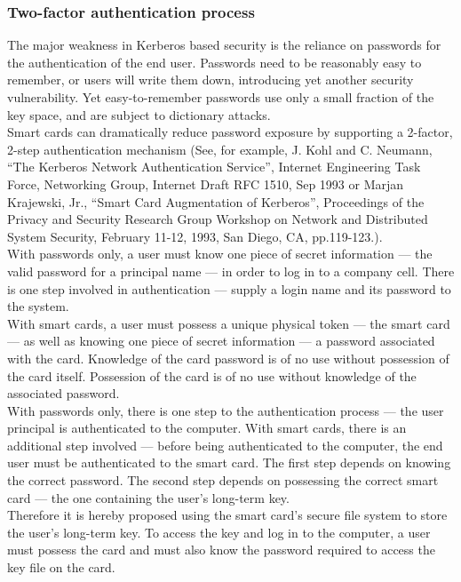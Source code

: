 \subsubsection{Two-factor authentication process}
The major weakness in Kerberos based security is the reliance on
passwords for the authentication of the end user. Passwords need to be
reasonably easy to remember, or users will write them down, introducing
yet another security vulnerability. Yet easy-to-remember passwords use
only a small fraction of the key space, and are subject to dictionary
attacks.\\

Smart cards can dramatically reduce password exposure by supporting a
2-factor, 2-step authentication mechanism (See, for example, J. Kohl
and C. Neumann, ``The Kerberos Network Authentication Service'',
Internet Engineering Task Force, Networking Group, Internet Draft RFC
1510, Sep 1993 or Marjan Krajewski, Jr., ``Smart Card Augmentation of
Kerberos'', Proceedings of the Privacy and Security Research Group
Workshop on Network and Distributed System Security, February 11-12,
1993, San Diego, CA, pp.119-123.).\\

With passwords only, a user must know one piece of secret information
--- the valid password for a principal name --- in order to log in to a
company cell. There is one step involved in authentication --- supply a
login name and its password to the system.\\

With smart cards, a user must possess a unique physical token --- the
smart card --- as well as knowing one piece of secret information --- a
password associated with the card. Knowledge of the card password is of
no use without possession of the card itself. Possession of the card is
of no use without knowledge of the associated password.\\

With passwords only, there is one step to the authentication process ---
the user principal is authenticated to the computer. With smart cards,
there is an additional step involved --- before being authenticated to the
computer, the end user must be authenticated to the smart card. The first
step depends on knowing the correct password. The second step depends on
possessing the correct smart card --- the one containing the user's
long-term key.\\

Therefore it is hereby proposed using the smart card's secure file
system to store the user's long-term key. To access the key and log in
to the computer, a user must possess the card and must also know the
password required to access the key file on the card.\\

